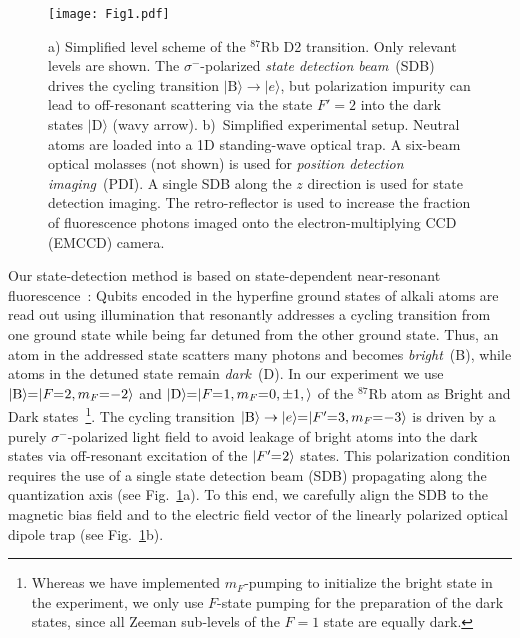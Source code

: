 \documentclass[aps,prl,twocolumn,english,showpacs]{revtex4-1}
\newcommand{\shrteq}{\hspace{-0.3em}=\hspace{-0.25em}}
\begin{document}
\begin{figure}[t]
\centering
    \texttt{[image: Fig1.pdf]}
\caption[Setup] {a) Simplified level scheme of the $^{87}$Rb D2 transition. Only relevant levels are shown.  The $\sigma^-$-polarized \emph{state detection beam}~(SDB) drives the cycling transition $\vert \text{B}\rangle \rightarrow \vert e \rangle$, but polarization impurity can lead to off-resonant scattering via the state $F'=2$ into the dark states $\vert \text{D}\rangle $ (wavy arrow). b)~Simplified experimental setup. Neutral atoms are loaded into a 1D standing-wave optical trap. A six-beam  optical molasses (not shown) is used for \emph{position detection imaging}~(PDI). A single SDB along the $z$ direction is used for state detection imaging. The retro-reflector is used to increase the fraction of fluorescence photons imaged onto the electron-multiplying CCD (EMCCD) camera.} {\label{fig:fig1}
}
\end{figure}

Our state-detection method is based on state-dependent near-resonant fluorescence~\cite{gibbons2011,fuhrmanek2011}: Qubits encoded in the hyperfine ground states of alkali atoms are read out using illumination that resonantly addresses a cycling transition from one ground state while being far detuned from the other ground state. Thus, an atom in the addressed state scatters many photons and becomes \emph{bright}~(B), while atoms in the detuned state remain \emph{dark}~(D). In our experiment we use $\vert \text{B} \rangle \shrteq \vert F \shrteq 2, m_F \shrteq  -2 \rangle $ and $\vert \text{D} \rangle \shrteq \vert F \shrteq 1, m_F \shrteq  0, \pm1,\rangle $ of the $^{87}$Rb atom as Bright and Dark states~\footnote{Whereas we have implemented $m_F$-pumping to initialize the bright state in the experiment, we only use $F$-state pumping for the preparation of the dark states, since all Zeeman sub-levels of the $F=1$ state are equally dark.}. The cycling transition $\vert \text{B}\rangle \rightarrow \vert e \rangle \shrteq  \vert F'\shrteq  3, m_F \shrteq -3\rangle$ is driven by a purely $\sigma^-$-polarized light field to avoid leakage of bright atoms into the dark states via off-resonant excitation of the $\vert F'\shrteq  2 \rangle$ states. This polarization condition requires the use of a single state detection beam (SDB) propagating along the quantization axis (see Fig.~\ref{fig:fig1}a). To this end, we carefully align the SDB to the magnetic bias field and to the electric field vector of the linearly polarized optical dipole trap (see Fig.~\ref{fig:fig1}b).
\end{document}
